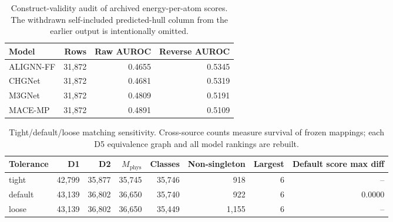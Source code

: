 \begin{table}[H]
\centering
\sitablefont
\caption{Construct-validity audit of archived energy-per-atom scores. The withdrawn self-included predicted-hull column from the earlier output is intentionally omitted.}
\label{tab:v3-raw}
\begin{adjustbox}{max width=\linewidth}
\begin{tabular}{@{}lrrr@{}}
\toprule
Model & Rows & Raw AUROC & Reverse AUROC \\
\midrule
ALIGNN-FF & 31,872 & 0.4655 & 0.5345 \\
CHGNet & 31,872 & 0.4681 & 0.5319 \\
M3GNet & 31,872 & 0.4809 & 0.5191 \\
MACE-MP & 31,872 & 0.4891 & 0.5109 \\
\bottomrule
\end{tabular}
\end{adjustbox}
\end{table}


\begin{table}[H]
\centering
\sitablefont
\caption{Tight/default/loose matching sensitivity. Cross-source counts measure survival of frozen mappings; each D5 equivalence graph and all model rankings are rebuilt.}
\label{tab:v3-match}
\begin{adjustbox}{max width=\linewidth}
\begin{tabular}{@{}lrrrrrrr@{}}
\toprule
Tolerance & D1 & D2 & $M_{\mathrm{phys}}$ & Classes & Non-singleton & Largest & Default score max diff \\
\midrule
tight & 42,799 & 35,877 & 35,745 & 35,746 & 918 & 6 & -- \\
default & 43,139 & 36,802 & 36,650 & 35,740 & 922 & 6 & 0.0000 \\
loose & 43,139 & 36,802 & 36,650 & 35,449 & 1,155 & 6 & -- \\
\bottomrule
\end{tabular}
\end{adjustbox}
\end{table}


